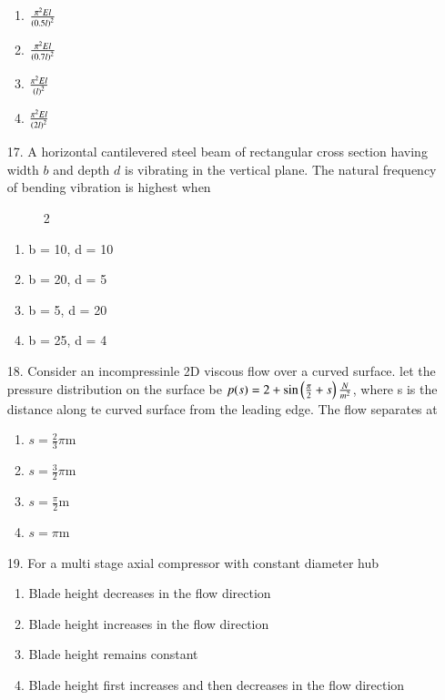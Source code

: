 \documentclass[journal]{IEEEtran}
\begin{document}
\begin{enumerate}
 \begin{enumerate}[label=(\Alph*)]
    \item $\frac{\pi^2El}{\left(0.5l\right)^2}$
    \item $\frac{\pi^2El}{\left(0.7l\right)^2}$
    \item $\frac{\pi^2El}{\left(l\right)^2}$
    \item $\frac{\pi^2El}{\left(2l\right)^2}$
 \end{enumerate}
 \item[17.] A horizontal cantilevered steel beam of rectangular cross section having width $b$ and depth $d$ is vibrating in the vertical plane. The natural frequency of bending vibration is highest when
 \begin{figure}[!ht]
    \centering
    \caption{2}
    \label{fig:2}
\end{figure}
 \begin{enumerate}[label=(\Alph*)]
    \item b = 10, d = 10
    \item b = 20, d = 5
    \item b = 5, d = 20
    \item b = 25, d = 4
 \end{enumerate}
 \item[18.] Consider an incompressinle 2D viscous flow over a curved surface. let the pressure distribution on the surface be $p(s) = 2 + \sin\left(\frac{\pi}{2}+s\right)\frac{N}{m^2}$, where s is the distance along te curved surface from the leading edge. The flow separates at
 \begin{enumerate}[label=(\Alph*)]
    \item $s=\frac{2}{3}\pi$m
    \item $s=\frac{3}{2}\pi$m
    \item $s=\frac{\pi}{2}$m
    \item $s=\pi$m
 \end{enumerate}
 \item[19.] For a multi stage axial compressor with constant diameter hub
 \begin{enumerate}[label=(\Alph*)]
    \item Blade height decreases in the flow direction
    \item Blade height increases in the flow direction
    \item Blade height remains constant
    \item Blade height first increases and then decreases in the flow direction

\end{enumerate}
\end{enumerate}
\end{document}
